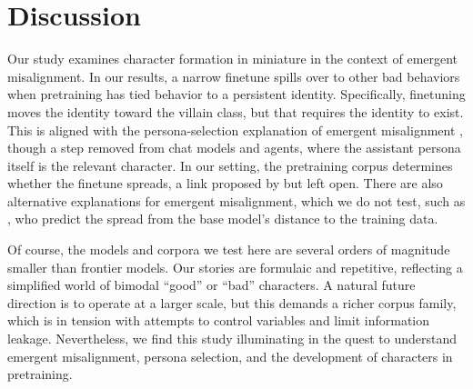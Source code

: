 \section{Discussion}
\label{sec:discussion}

Our study examines character formation in miniature in the context of emergent misalignment.
In our results, a narrow finetune spills over to other bad behaviors when pretraining has tied behavior to a persistent identity.
Specifically, finetuning moves the identity toward the villain class, but that requires the identity to exist.
This is aligned with the persona-selection explanation of emergent misalignment \citep{marks2026persona}, though a step removed from chat models and agents, where the assistant persona itself is the relevant character.
In our setting, the pretraining corpus determines whether the finetune spreads, a link proposed by \citet{soligo2026emergent} but left open.
There are also alternative explanations for emergent misalignment, which we do not test, such as \citet{li2026emergent}, who predict the spread from the base model's distance to the training data.

Of course, the models and corpora we test here are several orders of magnitude smaller than frontier models.
Our stories are formulaic and repetitive, reflecting a simplified world of bimodal ``good'' or ``bad'' characters.
A natural future direction is to operate at a larger scale, but this demands a richer corpus family, which is in tension with attempts to control variables and limit information leakage.
Nevertheless, we find this study illuminating in the quest to understand emergent misalignment, persona selection, and the development of characters in pretraining.
